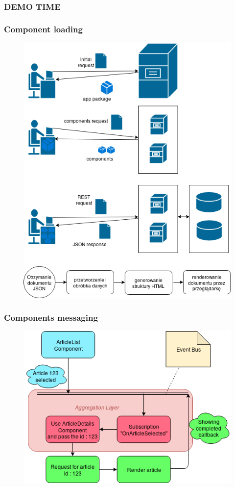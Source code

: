\begin{frame}
\frametitle{DEMO TIME}
\end{frame}


\begin{frame}
\frametitle{Component loading}
\begin{figure}
	\centering
	\includegraphics[width=0.5\linewidth]{pictures/communication_sequence}
	\label{fig:communicationsequence}
\end{figure}

\end{frame}

\begin{frame}
\frametitle{Components messaging}
\begin{figure}
	\centering
	\includegraphics[width=0.7\linewidth]{pictures/EventBus}
	\label{fig:eventbus}
\end{figure}

\end{frame}